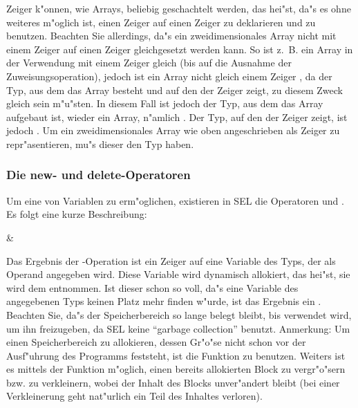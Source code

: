 Zeiger k"onnen, wie Arrays,
beliebig geschachtelt werden, das hei"st, da"s es ohne weiteres
m"oglich ist, einen Zeiger auf einen Zeiger zu deklarieren und zu
benutzen. Beachten Sie allerdings, da"s ein zweidimensionales
Array nicht mit einem Zeiger auf einen Zeiger gleichgesetzt
werden kann. So ist z.~B. ein Array  in
der Verwendung mit einem Zeiger  gleich (bis auf
die Ausnahme der Zuweisungsoperation), jedoch ist ein Array
 nicht gleich einem Zeiger , da der Typ, aus dem das Array besteht und auf den der
Zeiger zeigt, zu diesem Zweck gleich sein m"u"sten. In diesem Fall
ist jedoch der Typ, aus dem das Array aufgebaut ist, wieder ein
Array, n"amlich . Der Typ, auf den der Zeiger
zeigt, ist jedoch . Um ein zweidimensionales Array
wie oben angeschrieben als Zeiger zu repr"asentieren, mu"s dieser
den Typ  haben.

\subsubsection{Die new- und delete-Operatoren}
\label{newdelete}

Um eine  von Variablen zu erm"oglichen,
existieren in SEL die Operatoren  und . Es
folgt eine kurze Beschreibung:

\begin{operator}
  & 
\end{operator}

Das Ergebnis der -Operation ist ein Zeiger auf eine
Variable des Typs, der als Operand angegeben wird. Diese Variable
wird dynamisch allokiert, das hei"st, sie wird dem 
entnommen. Ist dieser schon so voll, da"s eine Variable des
angegebenen Typs keinen Platz mehr finden w"urde, ist das
Ergebnis ein . Beachten Sie, da"s der Speicherbereich
so lange belegt bleibt, bis  verwendet wird, um ihn
freizugeben, da SEL keine "`garbage collection"' benutzt.
Anmerkung: Um einen Speicherbereich zu allokieren, dessen Gr"o"se
nicht schon vor der Ausf"uhrung des Programms feststeht, ist die Funktion
 zu benutzen. Weiters ist es mittels der Funktion
 m"oglich, einen bereits
allokierten Block zu vergr"o"sern bzw. zu verkleinern, wobei der
Inhalt des Blocks unver"andert bleibt (bei einer Verkleinerung
geht nat"urlich ein Teil des Inhaltes verloren).


